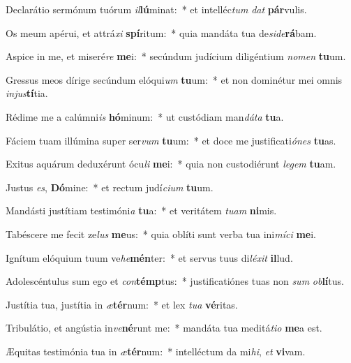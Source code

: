 \item Declarátio sermónum tuórum \textit{il}\textbf{lú}minat:~* et intelléc\textit{tum} \textit{dat} \textbf{pár}vulis.
\item Os meum apérui, et attrá\textit{xi} \textbf{spí}ritum:~* quia mandáta tua de\textit{si}\textit{de}\textbf{rá}bam.
\item Aspice in me, et miseré\textit{re} \textbf{me}i:~* secúndum judícium diligéntium \textit{no}\textit{men} \textbf{tu}um.
\item Gressus meos dírige secúndum elóqui\textit{um} \textbf{tu}um:~* et non dominétur mei omnis \textit{in}\textit{jus}\textbf{tí}tia.
\item Rédime me a calúmni\textit{is} \textbf{hó}minum:~* ut custódiam man\textit{dá}\textit{ta} \textbf{tu}a.
\item Fáciem tuam illúmina super ser\textit{vum} \textbf{tu}um:~* et doce me justificati\textit{ó}\textit{nes} \textbf{tu}as.
\item Exitus aquárum deduxérunt ócu\textit{li} \textbf{me}i:~* quia non custodiérunt \textit{le}\textit{gem} \textbf{tu}am.
\item Justus \textit{es}, \textbf{Dó}mine:~* et rectum judí\textit{ci}\textit{um} \textbf{tu}um.
\item Mandásti justítiam testimóni\textit{a} \textbf{tu}a:~* et veritátem \textit{tu}\textit{am} \textbf{ni}mis.
\item Tabéscere me fecit ze\textit{lus} \textbf{me}us:~* quia oblíti sunt verba tua ini\textit{mí}\textit{ci} \textbf{me}i.
\item Ignítum elóquium tuum ve\textit{he}\textbf{mén}ter:~* et servus tuus di\textit{lé}\textit{xit} \textbf{il}lud.
\item Adolescéntulus sum ego et \textit{con}\textbf{témp}tus:~* justificatiónes tuas non \textit{sum} \textit{ob}\textbf{lí}tus.
\item Justítia tua, justítia in \textit{æ}\textbf{tér}num:~* et lex \textit{tu}\textit{a} \textbf{vé}ritas.
\item Tribulátio, et angústia in\textit{ve}\textbf{né}runt me:~* mandáta tua meditá\textit{ti}\textit{o} \textbf{me}a est.
\item Æquitas testimónia tua in \textit{æ}\textbf{tér}num:~* intelléctum da mi\textit{hi}, \textit{et} \textbf{vi}vam.
